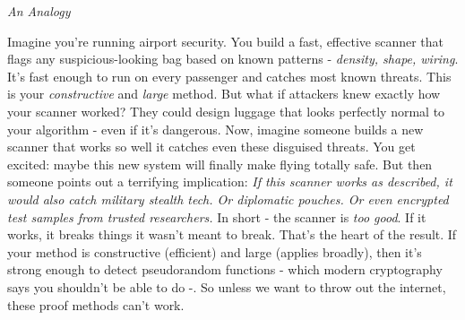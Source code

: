 \documentclass[12pt]{report}
\begin{document}
\begin{center}
    \vspace{0cm}
    {\large\itshape An Analogy\par}
\end{center}
Imagine you're running airport security.  
You build a fast, effective scanner that flags any suspicious-looking bag based on known patterns - \textit{density, shape, wiring}.
It's fast enough to run on every passenger and catches most known threats.
This is your \textit{constructive} and \textit{large} method.
But what if attackers knew exactly how your scanner worked?  
They could design luggage that looks perfectly normal to your algorithm - even if it's dangerous.
Now, imagine someone builds a new scanner that works so well it catches even these disguised threats.
You get excited: maybe this new system will finally make flying totally safe.
But then someone points out a terrifying implication:  
\textit{If this scanner works as described, it would also catch military stealth tech. Or diplomatic pouches. Or even encrypted test samples from trusted researchers.}
In short - the scanner is \textit{too good}.  
If it works, it breaks things it wasn't meant to break.
That's the heart of the \cite{razborov1994} result.
If your method is constructive (efficient) and large (applies broadly), then it's strong enough to detect pseudorandom functions - which modern cryptography says you shouldn't be able to do -\cite{arora2009}.  
So unless we want to throw out the internet, these proof methods can't work.
\end{document}
